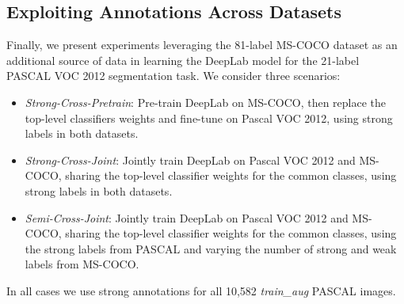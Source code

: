 

\subsection{Exploiting Annotations Across Datasets}
\label{sec:cross_dataset}

Finally, we present experiments leveraging the 81-label MS-COCO
dataset as an additional source of data in learning the DeepLab model
for the 21-label PASCAL VOC 2012 segmentation task. We consider
three scenarios:
\begin{itemize}
\item \textsl{Strong-Cross-Pretrain}: Pre-train DeepLab on MS-COCO,
  then replace the top-level classifiers weights and fine-tune on
  Pascal VOC 2012, using strong labels in both datasets.
\item \textsl{Strong-Cross-Joint}: Jointly train DeepLab on Pascal VOC
  2012 and MS-COCO, sharing the top-level classifier weights for the
  common classes, using strong labels in both datasets.
\item \textsl{Semi-Cross-Joint}: Jointly train DeepLab on Pascal VOC
  2012 and MS-COCO, sharing the top-level classifier weights for the
  common classes, using the strong labels from PASCAL and varying the
  number of strong and weak labels from MS-COCO.
\end{itemize}
In all cases we use strong annotations for all 10,582
\textsl{train\_aug} PASCAL images.

